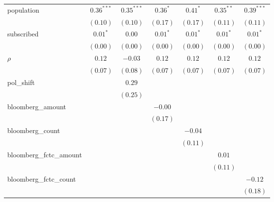 \begin{table}[!h]
\begin{center}
\begin{tabular}{l c c c c c c }
population              & $0.36^{***}$  & $0.35^{***}$ & $0.36^{*}$    & $0.41^{*}$    & $0.35^{**}$   & $0.39^{***}$  \\
                        & $(0.10)$      & $(0.10)$     & $(0.17)$      & $(0.17)$      & $(0.11)$      & $(0.11)$      \\
subscribed              & $0.01^{*}$    & $0.00$       & $0.01^{*}$    & $0.01^{*}$    & $0.01^{*}$    & $0.01^{*}$    \\
                        & $(0.00)$      & $(0.00)$     & $(0.00)$      & $(0.00)$      & $(0.00)$      & $(0.00)$      \\
$\rho$                  & $0.12$        & $-0.03$      & $0.12$        & $0.12$        & $0.12$        & $0.12$        \\
                        & $(0.07)$      & $(0.08)$     & $(0.07)$      & $(0.07)$      & $(0.07)$      & $(0.07)$      \\
pol\_shift              &               & $0.29$       &               &               &               &               \\
                        &               & $(0.25)$     &               &               &               &               \\
bloomberg\_amount       &               &              & $-0.00$       &               &               &               \\
                        &               &              & $(0.17)$      &               &               &               \\
bloomberg\_count        &               &              &               & $-0.04$       &               &               \\
                        &               &              &               & $(0.11)$      &               &               \\
bloomberg\_fctc\_amount &               &              &               &               & $0.01$        &               \\
                        &               &              &               &               & $(0.11)$      &               \\
bloomberg\_fctc\_count  &               &              &               &               &               & $-0.12$       \\
                        &               &              &               &               &               & $(0.18)$      \\
\midrule

\end{tabular}
\end{center}
\end{table}
